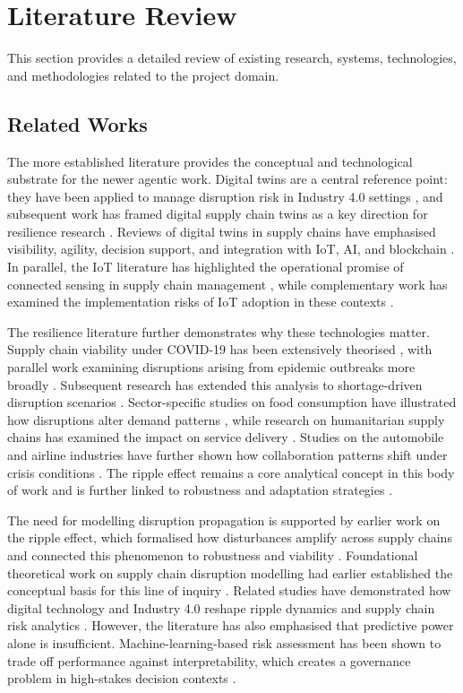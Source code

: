 \section[Literature Review]{\textbf{Literature Review}}
This section provides a detailed review of existing research, systems, technologies, and methodologies related to the project domain.

\subsection[Related Works]{\textbf{Related Works}}

The more established literature provides the conceptual and technological substrate for the newer agentic work. Digital twins are a central reference point: they have been applied to manage disruption risk in Industry 4.0 settings \cite{Ivanov2020}, and subsequent work has framed digital supply chain twins as a key direction for resilience research \cite{Nayal2022}. Reviews of digital twins in supply chains have emphasised visibility, agility, decision support, and integration with IoT, AI, and blockchain \cite{Nayal2022}. In parallel, the IoT literature has highlighted the operational promise of connected sensing in supply chain management \cite{Birkel2019}, while complementary work has examined the implementation risks of IoT adoption in these contexts \cite{BenDaya2019}.

The resilience literature further demonstrates why these technologies matter. Supply chain viability under COVID-19 has been extensively theorised \cite{Ivanov2021}, with parallel work examining disruptions arising from epidemic outbreaks more broadly \cite{Queiroz2020}. Subsequent research has extended this analysis to shortage-driven disruption scenarios \cite{Ivanov2022}. Sector-specific studies on food consumption have illustrated how disruptions alter demand patterns \cite{Chenarides2021}, while research on humanitarian supply chains has examined the impact on service delivery \cite{Paul2021}. Studies on the automobile and airline industries have further shown how collaboration patterns shift under crisis conditions \cite{Belhadi2021}. The ripple effect remains a core analytical concept in this body of work \cite{Dolgui2020} and is further linked to robustness and adaptation strategies \cite{Sodhi2021}.

The need for modelling disruption propagation is supported by earlier work on the ripple effect, which formalised how disturbances amplify across supply chains and connected this phenomenon to robustness and viability \cite{IvanovDolguiSokolov2019}. Foundational theoretical work on supply chain disruption modelling had earlier established the conceptual basis for this line of inquiry \cite{Ivanov2017}. Related studies have demonstrated how digital technology and Industry 4.0 reshape ripple dynamics and supply chain risk analytics \cite{Ivanov2019}. However, the literature has also emphasised that predictive power alone is insufficient. Machine-learning-based risk assessment has been shown to trade off performance against interpretability, which creates a governance problem in high-stakes decision contexts \cite{Baryannis2019}.

